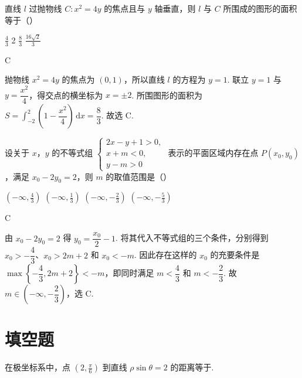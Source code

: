 \begin{problem}
直线 \(l\) 过抛物线 \(C: x^{2} = 4y\) 的焦点且与 \(y\) 轴垂直，则 \(l\) 与 \(C\) 所围成的图形的面积等于（\quad）

\choices
    {\(\frac{4}{3}\)}
    {2}
    {\( \frac{8}{3} \)}
    {\(\frac{16\sqrt{2}}{3}\)}
\end{problem}

\begin{answer}
C
\end{answer}

\begin{solution}

抛物线 \(x^2=4y\) 的焦点为 \((0,1)\)，所以直线 \(l\) 的方程为 \(y=1\). 联立 \(y=1\) 与 \(y=\dfrac{x^2}{4}\)，得交点的横坐标为 \(x=\pm2\). 所围图形的面积为
\(S=\int_{-2}^{2}\left(1-\dfrac{x^2}{4}\right)\,\mathrm{d}x=\dfrac83\). 故选 C.
\end{solution}

\begin{problem}
设关于 \(x\)，\(y\) 的不等式组 \(\begin{cases}
2x - y + 1 > 0,\\
x + m < 0,\\
y - m > 0
\end{cases}\) 表示的平面区域内存在点 \(P(x_0, y_0)\)，满足 \(x_0 - 2y_0 = 2\)，则 \(m\) 的取值范围是（\quad）

\choices
    {\(\left(-\infty, \frac{4}{3}\right)\)}
    {\(\left(-\infty, \frac{1}{3}\right)\)}
    {\(\left(-\infty, -\frac{2}{3}\right)\)}
    {\(\left(-\infty, -\frac{5}{3}\right)\)}
\end{problem}

\begin{answer}
C
\end{answer}

\begin{solution}

由 \(x_0-2y_0=2\) 得 \(y_0=\dfrac{x_0}{2}-1\). 将其代入不等式组的三个条件，分别得到
\(x_0>-\dfrac43\)、\(x_0>2m+2\) 和 \(x_0<-m\). 因此存在这样的 \(x_0\) 的充要条件是
\(\max\left\{-\dfrac43,2m+2\right\}<-m\)，即同时满足 \(m<\dfrac43\) 和 \(m<-\dfrac23\). 故 \(m\in\left(-\infty,-\dfrac23\right)\)，选 C.
\end{solution}

\section{填空题}

\begin{problem}
在极坐标系中，点 \(\left(2, \frac{\pi}{6}\right)\) 到直线 \(\rho \sin \theta = 2\) 的距离等于\fillinblank{}.
\end{problem}

